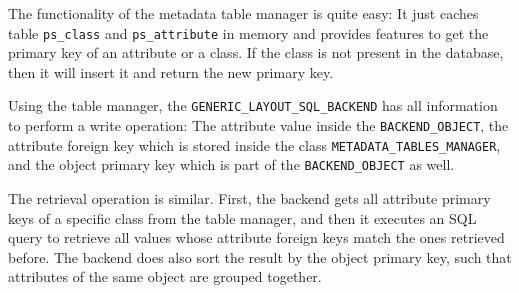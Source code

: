 \documentclass[a4paper,12pt]{report}
\begin{document}
The functionality of the metadata table manager is quite easy:
It just caches table \lstinline!ps_class! and \lstinline!ps_attribute! in memory and provides features to get the primary key of an attribute or a class.
If the class is not present in the database, then it will insert it and return the new primary key.

Using the table manager, the \lstinline!GENERIC_LAYOUT_SQL_BACKEND! has all information to perform a write operation:
The attribute value inside the \lstinline!BACKEND_OBJECT!, the attribute foreign key which is stored inside the class \lstinline!METADATA_TABLES_MANAGER!, 
and the object primary key which is part of the \lstinline!BACKEND_OBJECT! as well.

The retrieval operation is similar.
First, the backend gets all attribute primary keys of a specific class from the table manager, and then it executes an SQL query to retrieve all values whose attribute foreign keys match the ones retrieved before.
The backend does also sort the result by the object primary key, such that attributes of the same object are grouped together.
\end{document}
